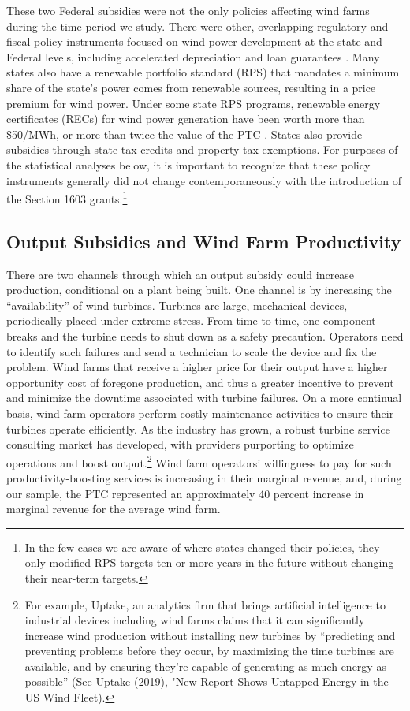 \documentclass[12pt]{article}
\begin{document}
These two Federal subsidies were not the only policies affecting wind farms during the time period we study. There were other, overlapping regulatory and fiscal policy instruments focused on wind power development at the state and Federal levels, including accelerated depreciation and loan guarantees \citep{aldy_preliminary_2013,metcalf_investment_2010,schmalensee_evaluating_2012}. Many states also have a renewable portfolio standard (RPS) that mandates a minimum share of the state's power comes from renewable sources, resulting in a price premium for wind power. Under some state RPS programs, renewable energy certificates (RECs) for wind power generation have been worth more than \$50/MWh, or more than twice the value of the PTC \citep{schmalensee_evaluating_2012}. States also provide subsidies through state tax credits and property tax exemptions. For purposes of the statistical analyses below, it is important to recognize that these policy instruments generally did not change contemporaneously with the introduction of the Section 1603 grants.\footnote{In the few cases we are aware of where states changed their policies, they only modified RPS targets ten or more years in the future without changing their near-term targets.}


\subsection{Output Subsidies and Wind Farm Productivity \label{subsec:outputModel}}

There are two channels through which an output subsidy could increase production, conditional on a plant being built.  One channel is by increasing the ``availability'' of wind turbines. Turbines are large, mechanical devices, periodically placed under extreme stress. From time to time, one component breaks and the turbine needs to shut down as a safety precaution. Operators need to identify such failures and send a technician to scale the device and fix the problem. Wind farms that receive a higher price for their output have a higher opportunity cost of foregone production, and thus a greater incentive to prevent and minimize the downtime associated with turbine failures. On a more continual basis,  wind farm operators perform costly maintenance activities to ensure their turbines operate efficiently. As the industry has grown, a robust turbine service consulting market has developed, with providers purporting to optimize operations and boost output.\footnote{For example, Uptake, an analytics firm that brings artificial intelligence to industrial devices including wind farms claims that it can significantly increase wind production without installing new turbines by ``predicting and preventing problems before they occur, by maximizing the time turbines are available, and by ensuring they're capable of generating as much energy as possible'' (See Uptake (2019), "New Report Shows Untapped Energy in the US Wind Fleet). } Wind farm operators' willingness to pay for such productivity-boosting services is increasing in their marginal revenue, and, during our sample, the PTC represented an approximately 40 percent increase in marginal revenue for the average wind farm.
\end{document}
